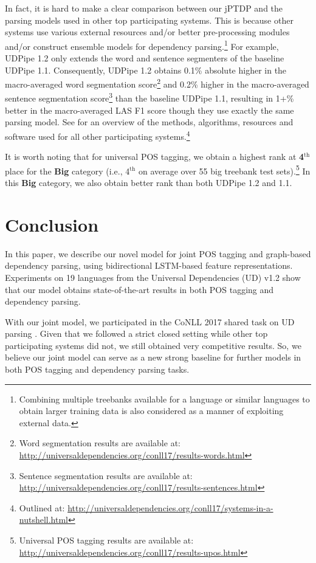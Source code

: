 \documentclass[11pt,letterpaper]{article}
\begin{document}
In fact, it is hard to make a clear comparison between our jPTDP and the parsing models used in other top participating systems. This is because other systems use various external resources and/or better pre-processing modules and/or construct ensemble models for dependency parsing.\footnote{Combining multiple treebanks available for a language or similar languages to obtain larger training data is also considered as a manner of exploiting external data.} For example, UDPipe 1.2 only extends  the word and sentence segmenters of the baseline UDPipe 1.1. Consequently,  UDPipe 1.2 obtains 0.1\% absolute higher in  the macro-averaged word segmentation score\footnote{Word segmentation results are available at: \\ \url{http://universaldependencies.org/conll17/results-words.html}} and 0.2\% higher in the macro-averaged sentence segmentation score\footnote{Sentence segmentation results are available at: \\  \url{http://universaldependencies.org/conll17/results-sentences.html}} than the baseline UDPipe 1.1, resulting in 1+\% better in the macro-averaged LAS F1 score though they use exactly the same parsing model. 
See \citet{udst:overview} for an overview of the methods, algorithms, resources and software used for all other participating systems.\footnote{Outlined at:  \url{http://universaldependencies.org/conll17/systems-in-a-nutshell.html}} 

It is worth noting that for  universal POS tagging, we obtain a highest rank at \textbf{4}$^{\text{th}}$ place for the \textbf{Big} category (i.e., {4}$^{\text{th}}$ on average over 55 big treebank test sets).\footnote{Universal POS tagging results are available at:\\ \url{http://universaldependencies.org/conll17/results-upos.html}}  In this \textbf{Big} category, we also obtain better rank  than both   UDPipe 1.2 and 1.1. 


\section{Conclusion}

In this paper, we describe our novel model  for joint POS tagging and graph-based dependency parsing, using bidirectional LSTM-based feature representations. Experiments on 19 languages from the Universal Dependencies (UD) v1.2 show that our model obtains state-of-the-art results in both POS tagging and dependency parsing. 

With our joint model, we  participated in the CoNLL 2017 shared task on UD parsing \citep{udst:overview}.  Given that we followed a strict closed setting while other top participating systems did not,  we still obtained  very competitive results. So, we believe  our joint model can serve as a new strong baseline for further models in both POS tagging and dependency parsing tasks.  
\end{document}
